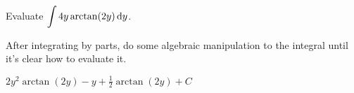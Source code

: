 \subsection*{\Application}


\begin{question}[2016Q3]
Evaluate $\displaystyle\int 4y\arctan(2y) \,\mathrm{d}y$.
\end{question}

\begin{hint}
After integrating by parts, do some algebraic manipulation to the integral until it's clear how to evaluate it.
\end{hint}

\begin{answer}
$2y^2\arctan(2y) - y + \frac12\arctan(2y) + C$
\end{answer}

